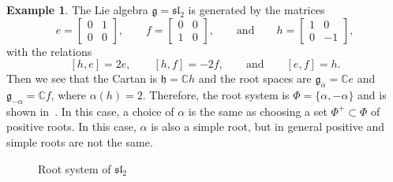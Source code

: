 \documentclass{amsart}
\theoremstyle{definition}
\newtheorem{exm}[thm]{Example}
\theoremstyle{remark}
\theoremstyle{plain}
\theoremstyle{definition}
\theoremstyle{remark}
\newcommand{\C}{\mathbb{C}}
\newcommand{\g}{\mathfrak{g}}
\newcommand{\h}{\mathfrak{h}}
\newcommand{\mf}[1]{\mathfrak{#1}}
\newcommand{\1}{\mathbf{1}}
\newcommand{\2}{\mathbf{2}}
\newcommand{\3}{\mathbf{3}}
\renewcommand{\sl}{\mf{sl}}
\begin{document}
\begin{exm}
    The Lie algebra \(\g = \sl_2\) is generated by the matrices
    \[ e = \begin{bmatrix}
        0 & 1 \\
        0 & 0
    \end{bmatrix}, \qquad f = \begin{bmatrix}
        0 & 0 \\
        1 & 0
    \end{bmatrix}, \qquad \text{and} \qquad h = \begin{bmatrix}
        1 & 0 \\
        0 & -1
    \end{bmatrix}, \]
    with the relations
    \[ [h,e] = 2e, \qquad [h,f] = -2f, \qquad \text{and} \qquad [e,f] = h. \]
    Then we see that the Cartan is \(\h = \C h\) and the root spaces are \(\g_{\alpha} = \C e\) and \(\g_{-\alpha} = \C f\), where \(\alpha(h) = 2\). Therefore, the root system is \(\Phi = \{\alpha, -\alpha\}\) and is shown in~. In this case, a choice of \(\alpha\) is the same as choosing a set \(\Phi^+ \subset \Phi \) of positive roots. In this case, \(\alpha\) is also a simple root, but in general positive and simple roots are not the same.

    \begin{figure}[htpb]
    \begin{center}
    \end{center}
    \caption{Root system of \(\sl_2\)}%
    \label{fig:sl2-roots}
    \end{figure}


\end{exm}
\end{document}
